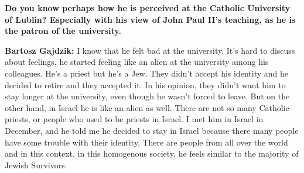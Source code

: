 \textbf{Do you know perhaps how he is perceived at the Catholic University of Lublin? Especially with his view of John Paul II’s teaching, as he is the patron of the university.}  

\textbf{Bartosz Gajdzik:} I know that he felt bad at the university. It’s hard to discuss about feelings, he started feeling like an alien at the university among his colleagues. He’s a priest but he’s a Jew. They didn’t accept his identity and he decided to retire and they accepted it. In his opinion, they didn’t want him to stay longer at the university, even though he wasn’t forced to leave. But on the other hand, in Israel he is like an alien as well. There are not so many Catholic priests, or people who used to be priests in Israel. I met him in Israel in December, and he told me he decided to stay in Israel because there many people have some trouble with their identity. There are people from all over the world and in this context, in this homogenous society, he feels similar to the majority of Jewish Survivors.  